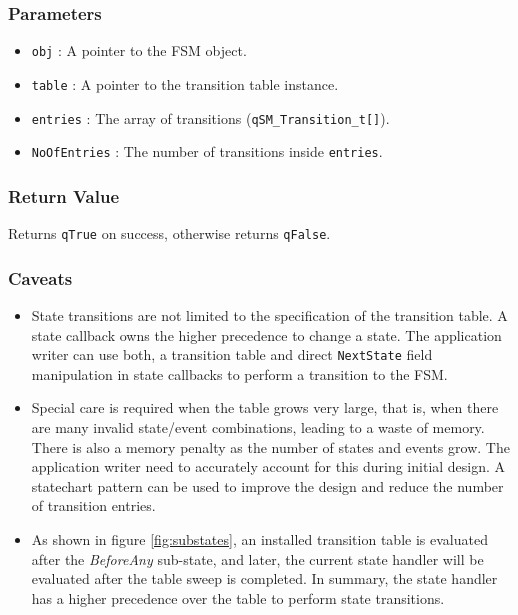 \subsubsection*{Parameters}
\begin{itemize}
    \item \lstinline{obj} : A pointer to the FSM object. 
    \item \lstinline{table} : A pointer to the transition table instance.
    \item \lstinline{entries} : The array of transitions (\lstinline{qSM_Transition_t[]}). 
    \item \lstinline{NoOfEntries} : The number of transitions inside \lstinline{entries}.
\end{itemize}

\subsubsection*{Return Value}
Returns \lstinline{qTrue} on success, otherwise returns \lstinline{qFalse}.

\hrulefill

\subsubsection*{Caveats}
\begin{itemize}
    \item State transitions are not limited to the specification of the transition table. A state callback owns the higher precedence to change a state. The application writer can use both, a transition table and direct \lstinline{NextState} field manipulation in state callbacks to perform a transition to the FSM.
    \item Special care is required when the table grows very large, that is, when there are many invalid state/event combinations, leading to a waste of memory. There is also a memory penalty as the number of states and events grow. The application writer  need to accurately account for this during initial design. A statechart pattern can be used to improve the design and reduce the number of transition entries. 
    \item As shown in figure \ref{fig:substates}, an installed transition table is evaluated after the \textit{BeforeAny} sub-state, and later, the current state handler will be evaluated after the table sweep is completed. In summary, the state handler has a higher precedence over the table to perform state transitions.
\end{itemize}

